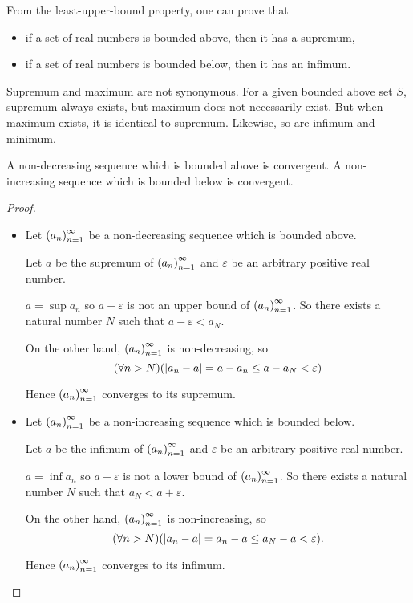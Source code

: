 From the least-upper-bound property, one can prove that
\begin{itemize}
    \item if a set of real numbers is bounded above, then it has a supremum,
    \item if a set of real numbers is bounded below, then it has an infimum.
\end{itemize}

Supremum and maximum are not synonymous. For a given bounded above set $S$, supremum always exists, but maximum does not necessarily exist. But when maximum exists, it is identical to supremum. Likewise, so are infimum and minimum.

\begin{theorem}
    A non-decreasing sequence which is bounded above is convergent. A non-increasing sequence which is bounded below is convergent.
\end{theorem}

\begin{proof}
    \begin{itemize}
        \item Let ${\left({a_{n}}\right)}^{\infty}_{n=1}$ be a non-decreasing sequence which is bounded above.

              Let $a$ be the supremum of ${\left({a_{n}}\right)}^{\infty}_{n=1}$ and $\varepsilon$ be an arbitrary positive real number.

              $a = \sup{a_{n}}$ so $a - \varepsilon$ is not an upper bound of ${\left({a_{n}}\right)}^{\infty}_{n=1}$. So there exists a natural number $N$ such that $a - \varepsilon < a_{N}$.

              On the other hand, ${\left({a_{n}}\right)}^{\infty}_{n=1}$ is non-decreasing, so
              \[
                  (\forall n > N)(\left\vert{a_{n} - a}\right\vert = a - a_{n} \le a - a_{N} < \varepsilon)
              \]

              Hence ${\left({a_{n}}\right)}^{\infty}_{n=1}$ converges to its supremum.
        \item Let ${\left({a_{n}}\right)}^{\infty}_{n=1}$ be a non-increasing sequence which is bounded below.

              Let $a$ be the infimum of ${\left({a_{n}}\right)}^{\infty}_{n=1}$ and $\varepsilon$ be an arbitrary positive real number.

              $a = \inf{a_{n}}$ so $a + \varepsilon$ is not a lower bound of ${\left({a_{n}}\right)}^{\infty}_{n=1}$. So there exists a natural number $N$ such that $a_{N} < a + \varepsilon$.

              On the other hand, ${\left({a_{n}}\right)}^{\infty}_{n=1}$ is non-increasing, so
              \[
                  (\forall n > N)(\left\vert{a_{n} - a}\right\vert = a_{n} - a \le a_{N} - a < \varepsilon).
              \]

              Hence ${\left({a_{n}}\right)}^{\infty}_{n=1}$ converges to its infimum.
    \end{itemize}
\end{proof}

